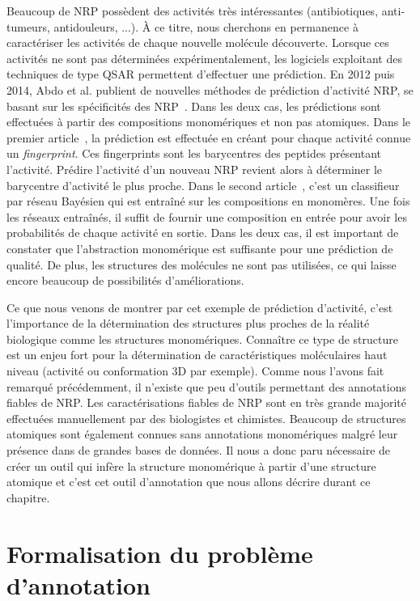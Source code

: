 Beaucoup de NRP possèdent des activités très intéressantes (antibiotiques, anti-tumeurs, antidouleurs, ...).
À ce titre, nous cherchons en permanence à caractériser les activités de chaque nouvelle molécule découverte.
Lorsque ces activités ne sont pas déterminées expérimentalement, les logiciels exploitant des techniques de type QSAR permettent d'effectuer une prédiction.
En 2012 puis 2014, Abdo et al. publient de nouvelles méthodes de prédiction d'activité NRP, se basant sur les spécificités des NRP~\cite{abdo_new_2012, abdo_prediction_2014}.
Dans les deux cas, les prédictions sont effectuées à partir des compositions monomériques et non pas atomiques.
Dans le premier article~\cite{abdo_new_2012}, la prédiction est effectuée en créant pour chaque activité connue un \textit{fingerprint}.
Ces fingerprints sont les barycentres des peptides présentant l'activité.
Prédire l'activité d'un nouveau NRP revient alors à déterminer le barycentre d'activité le plus proche.
Dans le second article~\cite{abdo_prediction_2014}, c'est un classifieur par réseau Bayésien qui est entraîné sur les compositions en monomères.
Une fois les réseaux entraînés, il suffit de fournir une composition en entrée pour avoir les probabilités de chaque activité en sortie.
Dans les deux cas, il est important de constater que l'abstraction monomérique est suffisante pour une prédiction de qualité.
De plus, les structures des molécules ne sont pas utilisées, ce qui laisse encore beaucoup de possibilités d'améliorations.

Ce que nous venons de montrer par cet exemple de prédiction d'activité, c'est l'importance de la détermination des structures plus proches de la réalité biologique comme les structures monomériques.
Connaître ce type de structure est un enjeu fort pour la détermination de caractéristiques moléculaires haut niveau (activité ou conformation 3D par exemple).
Comme nous l'avons fait remarqué précédemment, il n'existe que peu d'outils permettant des annotations fiables de NRP.
Les caractérisations fiables de NRP sont en très grande majorité effectuées manuellement par des biologistes et chimistes.
Beaucoup de structures atomiques sont également connues sans annotations monomériques malgré leur présence dans de grandes bases de données.
Il nous a donc paru nécessaire de créer un outil qui infère la structure monomérique à partir d'une structure atomique et c'est cet outil d'annotation que nous allons décrire durant ce chapitre.




\section{Formalisation du problème d'annotation}

